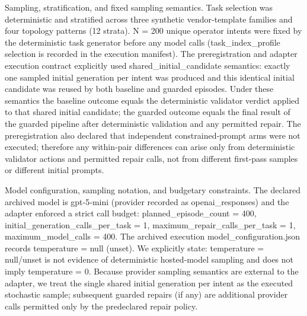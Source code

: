\documentclass[conference]{IEEEtran}
\begin{document}
Sampling, stratification, and fixed sampling semantics. Task selection was deterministic and stratified across three synthetic vendor‑template families and four topology patterns (12 strata). N = 200 unique operator intents were fixed by the deterministic task generator before any model calls (task\_index\_profile selection is recorded in the execution manifest). The preregistration and adapter execution contract explicitly used shared\_initial\_candidate semantics: exactly one sampled initial generation per intent was produced and this identical initial candidate was reused by both baseline and guarded episodes. Under these semantics the baseline outcome equals the deterministic validator verdict applied to that shared initial candidate; the guarded outcome equals the final result of the guarded pipeline after deterministic validation and any permitted repair. The preregistration also declared that independent constrained‑prompt arms were not executed; therefore any within‑pair differences can arise only from deterministic validator actions and permitted repair calls, not from different first‑pass samples or different initial prompts.

Model configuration, sampling notation, and budgetary constraints. The declared archived model is gpt‑5‑mini (provider recorded as openai\_responses) and the adapter enforced a strict call budget: planned\_episode\_count = 400, initial\_generation\_calls\_per\_task = 1, maximum\_repair\_calls\_per\_task = 1, maximum\_model\_calls = 400. The archived execution model\_configuration.json records temperature = null (unset). We explicitly state: temperature = null/unset is not evidence of deterministic hosted‑model sampling and does not imply temperature = 0. Because provider sampling semantics are external to the adapter, we treat the single shared initial generation per intent as the executed stochastic sample; subsequent guarded repairs (if any) are additional provider calls permitted only by the predeclared repair policy.
\end{document}
